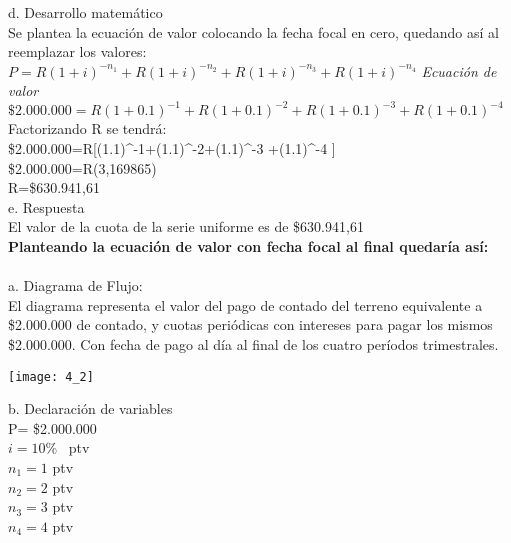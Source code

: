 d. Desarrollo matemático \\



Se plantea la ecuación de valor colocando la fecha focal en cero, quedando así al reemplazar los valores:\\

	$P=R(1+i)^{-n_1 }+R(1+i)^{-n_2 }+R(1+i)^{-n_3}+R(1+i)^{-n_4}$ \hspace{8} \textit{Ecuación de valor}\\

$	\$2.000.000=R(1+0.1)^{-1}+R(1+0.1)^{-2}+R(1+0.1)^{-3 }+R(1+0.1)^{-4}$ \\


Factorizando R se tendrá:\\


		\$2.000.000=R[(1.1)^{-1}+(1.1)^{-2}+(1.1)^{-3 }+(1.1)^{-4 }]
		\\
		\$2.000.000=R(3,169865)
		\\
		R=\$630.941,61\\    

e. Respuesta \\



El valor de la cuota de la serie uniforme es de \$630.941,61 \\

\textbf{Planteando la ecuación de valor con fecha focal al final quedaría así:      }
\\\\
{a.  Diagrama de Flujo:} \\
El diagrama representa el valor del pago de contado del terreno equivalente a \$2.000.000 de contado, y cuotas periódicas con intereses para pagar los mismos \$2.000.000. Con fecha de pago al día al final de los cuatro períodos trimestrales.

\begin{center}
	\texttt{[image: 4\_2]}
\end{center}

b. Declaración de variables \\

        P= \$2.000.000\\
        $i=10\%$ \ ptv\\        
		$n_{1}=1$ ptv
		\\
		$n_{2}=2$ ptv
		\\
		$n_{3}=3$ ptv
		\\
		$n_{4}=4$ ptv
		\\
	


